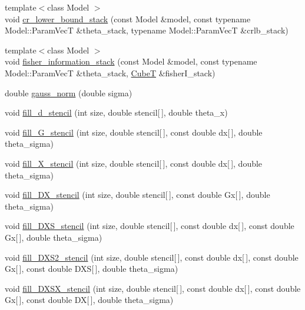 \begin{DoxyCompactItemize}
{\footnotesize template$<$class Model $>$ }\\void \hyperlink{namespacemappel_af7a80413a48625a3d97079177d8f959b}{cr\+\_\+lower\+\_\+bound\+\_\+stack} (const Model \&model, const typename Model\+::\+Param\+VecT \&theta\+\_\+stack, typename Model\+::\+Param\+VecT \&crlb\+\_\+stack)
\item 
{\footnotesize template$<$class Model $>$ }\\void \hyperlink{namespacemappel_a77bdeb8e88ba5b04e736ff55ab9a33fd}{fisher\+\_\+information\+\_\+stack} (const Model \&model, const typename Model\+::\+Param\+VecT \&theta\+\_\+stack, \hyperlink{namespacemappel_ab2afab4e6c8805e83946670d882768c2}{CubeT} \&fisher\+I\+\_\+stack)
\item 
double \hyperlink{namespacemappel_afdf826a9bc6ea906415c89f1e7087f1a}{gauss\+\_\+norm} (double sigma)
\item 
void \hyperlink{namespacemappel_a0bd2fc62ed44e755a6777d1209fe6bac}{fill\+\_\+d\+\_\+stencil} (int size, double stencil\mbox{[}$\,$\mbox{]}, double theta\+\_\+x)
\item 
void \hyperlink{namespacemappel_a5ca82edc201e8605107a991493ad0d5e}{fill\+\_\+\+G\+\_\+stencil} (int size, double stencil\mbox{[}$\,$\mbox{]}, const double dx\mbox{[}$\,$\mbox{]}, double theta\+\_\+sigma)
\item 
void \hyperlink{namespacemappel_ab6a11cd06ff348138cb04635b03a6de2}{fill\+\_\+\+X\+\_\+stencil} (int size, double stencil\mbox{[}$\,$\mbox{]}, const double dx\mbox{[}$\,$\mbox{]}, double theta\+\_\+sigma)
\item 
void \hyperlink{namespacemappel_ad2dd4330fc626fa673a3acf691d6b9a7}{fill\+\_\+\+D\+X\+\_\+stencil} (int size, double stencil\mbox{[}$\,$\mbox{]}, const double Gx\mbox{[}$\,$\mbox{]}, double theta\+\_\+sigma)
\item 
void \hyperlink{namespacemappel_ab0cb62f6dcecae5ff19468d87a283e7a}{fill\+\_\+\+D\+X\+S\+\_\+stencil} (int size, double stencil\mbox{[}$\,$\mbox{]}, const double dx\mbox{[}$\,$\mbox{]}, const double Gx\mbox{[}$\,$\mbox{]}, double theta\+\_\+sigma)
\item 
void \hyperlink{namespacemappel_a445e83c8273da9b3a50cc10d038ed612}{fill\+\_\+\+D\+X\+S2\+\_\+stencil} (int size, double stencil\mbox{[}$\,$\mbox{]}, const double dx\mbox{[}$\,$\mbox{]}, const double Gx\mbox{[}$\,$\mbox{]}, const double D\+XS\mbox{[}$\,$\mbox{]}, double theta\+\_\+sigma)
\item 
void \hyperlink{namespacemappel_ad3a6553e54dc90232fc04c93731fc69c}{fill\+\_\+\+D\+X\+S\+X\+\_\+stencil} (int size, double stencil\mbox{[}$\,$\mbox{]}, const double dx\mbox{[}$\,$\mbox{]}, const double Gx\mbox{[}$\,$\mbox{]}, const double DX\mbox{[}$\,$\mbox{]}, double theta\+\_\+sigma)

\end{DoxyCompactItemize}

